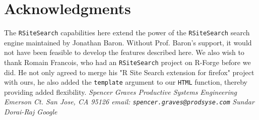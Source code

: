 \section*{Acknowledgments}
The {\tt RSiteSearch} capabilities here extend the power of the
{\tt RSiteSearch} search engine maintained by Jonathan Baron.
Without Prof. Baron's support, it would not have been feasible
to develop the features described here.  We also wish to thank
Romain Francois, who had an {\tt RSiteSearch} project on R-Forge
before we did.  He not only agreed to merge his "R Site Search
extension for firefox" project with ours, he also added the
{\tt template} argument to our {\tt HTML} function, thereby
providing added flexibility.
\newline \newline
\emph{Spencer Graves \newline
Productive Systems Engineering  Emerson Ct. \newline
San Jose, CA 95126 \newline
email:  {\tt spencer.graves@prodsyse.com} }
\newline \newline
\emph{Sundar Dorai-Raj \newline
Google }
